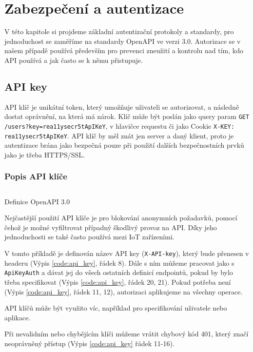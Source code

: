 \chapter{Zabezpečení a autentizace}
V této kapitole si projdeme základní autentizační protokoly a standardy, pro jednoduchost se zaměříme na standardy OpenAPI ve verzi 3.0. Autorizace se v našem případě používá především pro prevenci zneužití a kontrolu nad tím, kdo API používá a jak často se k němu přistupuje.


\section{API key}
API klíč je unikátní token, který umožňuje uživateli se autorizovat, a následně dostat oprávnění, na která má nárok. Klíč může být poslán jako query param \texttt{GET /users?key=rea11ysecr5tApIKeY}, v hlavičce requestu či jako Cookie \texttt{X-KEY: rea11ysecr5tApIKeY}. API klíč by měl znát jen server a daný klient, proto je autentizace brána jako bezpečná pouze při použití dalších bezpečnostních prvků jako je třeba HTTPS/SSL. \cite{swaggerApiKeys} \cite{fortinetApiKeys}

\subsection{Popis API klíče}
\begin{listing}[ht]
    \inputminted[]{yaml}{resources/code/security/openapi-key.yml}
    \caption{Definice OpenAPI 3.0 \cite{swaggerApiKeys}}
    \label{code:api_key}
\end{listing}

Nejčastější použití API klíče je pro blokování anonymních požadavků, pomocí čehož je možné vyfiltrovat případný škodlivý provoz na API. Díky jeho jednoduchosti se také často používá mezi IoT zařízeními.

V tomto příkladě je definován název API key (\texttt{X-API-key}), který bude přenesen v headeru (Výpis \ref{code:api_key}, řádek 8). Dále s ním můžeme pracovat jako s \texttt{ApiKeyAuth} a dávat jej do všech ostatních definicí endpointů, pokud by bylo třeba specifikovat (Výpis \ref{code:api_key}, řádek 20, 21). Pokud potřeba není (Výpis \ref{code:api_key}, řádek 11, 12), autorizaci aplikujeme na všechny operace. 

API klíčů může být využito víc, například pro specifikování uživatele nebo aplikace.

Při nevalidním nebo chybějícím klíči můžeme vrátit chybový kód 401, který značí neoprávněný přístup (Výpis \ref{code:api_key} řádek 11-16).


